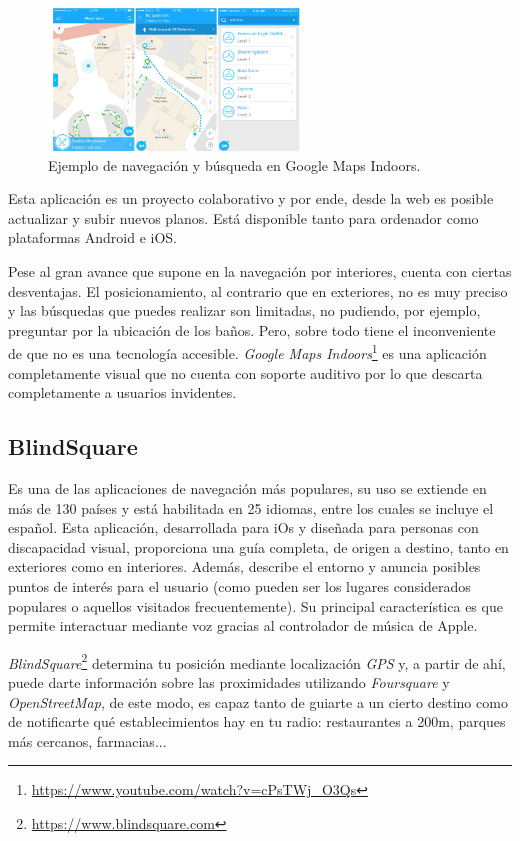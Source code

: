 \begin{figure}[t]
	\centering
	\includegraphics[width=0.6\textwidth]{GMapsInd}
	\caption{Ejemplo de navegación y búsqueda en Google Maps Indoors. }
	\label{fig:ejemplo3}
\end{figure}
Esta aplicación es un proyecto colaborativo y por ende, desde la web es posible actualizar y subir nuevos planos. Está disponible tanto para ordenador como plataformas Android e iOS.

Pese al gran avance que supone en la navegación por interiores, cuenta con ciertas desventajas. El posicionamiento, al contrario que en exteriores, no es muy preciso y las búsquedas que puedes realizar son limitadas, no pudiendo, por ejemplo, preguntar por la ubicación de los baños. Pero, sobre todo tiene el inconveniente de que no es una tecnología accesible. \textit{Google Maps Indoors}\footnote{\url{https://www.youtube.com/watch?v=cPsTWj_O3Qs}} es una aplicación completamente visual que no cuenta con soporte auditivo por lo que descarta completamente a usuarios invidentes.


\subsection{BlindSquare}
Es una de las aplicaciones de navegación más populares, su uso se extiende en más de 130 países y está habilitada en 25 idiomas, entre los cuales se incluye el español. Esta aplicación, desarrollada para iOs y diseñada para personas con discapacidad visual, proporciona una guía completa, de origen a destino, tanto en exteriores como en interiores. Además, describe el entorno y anuncia posibles puntos de interés para el usuario (como pueden ser los lugares considerados populares o aquellos visitados frecuentemente). Su principal característica es que permite interactuar mediante voz gracias al controlador de música de Apple. 

\textit{BlindSquare}\footnote{\url{https://www.blindsquare.com}} determina tu posición mediante localización \textit{GPS} y, a partir de ahí, puede darte información sobre las proximidades utilizando \textit{Foursquare} y \textit{OpenStreetMap}, de este modo, es capaz tanto de guiarte a un cierto destino como de notificarte qué establecimientos hay en tu radio: restaurantes a 200m, parques más cercanos, farmacias...

